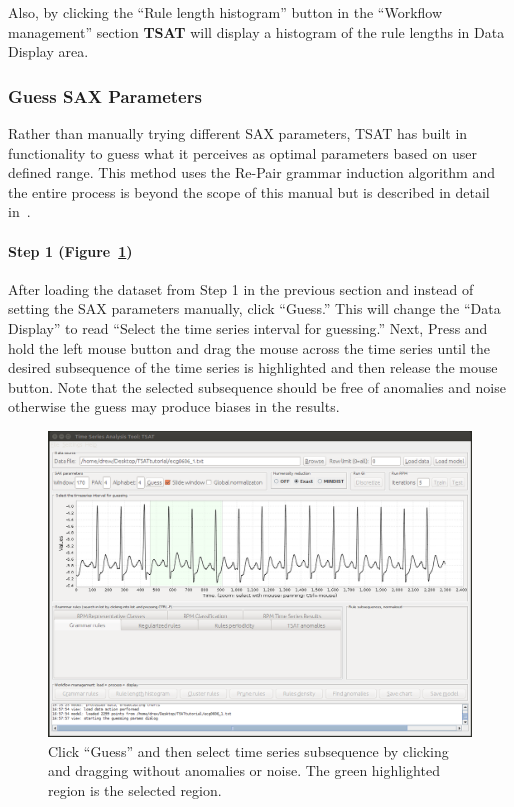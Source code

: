 \documentclass[titlepage, letterpaper, 12pt]{article}
\newcommand\TSAT{\textbf{TSAT}}
\begin{document}
Also, by clicking the ``Rule length histogram'' button in the ``Workflow management'' section {\TSAT} will display a histogram of the rule lengths in Data Display area.



\subsubsection{Guess SAX Parameters}

Rather than manually trying different SAX parameters, TSAT has built in functionality to guess what it perceives as optimal parameters based on user defined range.  This method uses the Re-Pair grammar induction algorithm and the entire process is beyond the scope of this manual but is described in detail in~\cite{paramSelection}.

\paragraph{Step 1 (Figure~\ref{fig:step1-guess})} After loading the dataset from Step 1 in the previous section and instead of setting the SAX parameters manually, click ``Guess.''  This will change the ``Data Display'' to read ``Select the time series interval for guessing.'' Next, Press and hold the left mouse button and drag the mouse across the time series until the desired subsequence of the time series is highlighted and then release the mouse button.  Note that the selected subsequence should be free of anomalies and noise otherwise the guess may produce biases in the results.

\begin{figure}[H]
	\centering
	\includegraphics[width=\textwidth]{pictures/motifguide/step1-guess}
	\caption{Click ``Guess'' and then select time series subsequence by clicking and dragging without anomalies or noise.  The green highlighted region is the selected region. }
	\label{fig:step1-guess}
\end{figure}
\end{document}
